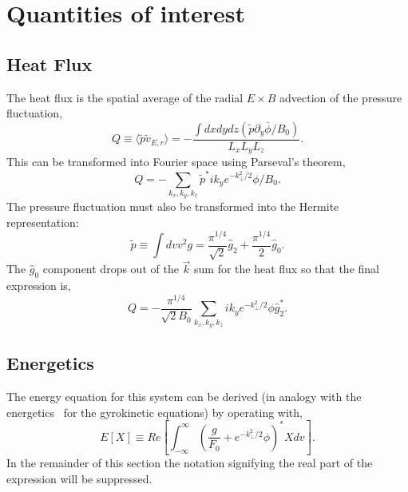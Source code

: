 \section{Quantities of interest}

\subsection{Heat Flux }
The heat flux is the spatial average of the radial $E\times B$ advection of the pressure fluctuation,
\begin{equation}
Q\equiv \langle \tilde{p} \tilde{v}_{E,r} \rangle= -\frac{\int dx dy dz \left ( \tilde{p}\partial_y \bar{\phi}/B_0 \right ) }{ L_x L_y L_z}.
\end{equation}
This can be transformed into Fourier space using Parseval's theorem,
\begin{equation}
Q=-\sum_{k_x,k_y,k_z} \tilde{p}^* i k_y  e^{-k_{\perp}^2/2} \phi/B_0 .
\end{equation}
The pressure fluctuation must also be transformed into the Hermite representation:
\begin{equation}
\tilde{p}\equiv \int dv v^2 g = \frac{\pi^{1/4}}{\sqrt{2}}\hat{g}_2 + \frac{\pi^{1/4}}{2}\hat{g}_0.
\end{equation}
The $\hat{g}_0$ component drops out of the $\vec{k}$ sum for the heat flux so that the final expression is,
\begin{equation}
Q=-\frac{\pi^{1/4}}{\sqrt{2}B_0}\sum_{k_x,k_y,k_z} i k_y  e^{-k_{\perp}^2/2} \phi \hat{g}^*_2.
\end{equation}

\subsection{Energetics }

The energy equation for this system can be derived (in analogy with the energetics~\cite{alejandro} for the gyrokinetic equations) by operating with, 
\begin{equation}
E[X]\equiv Re \left [ \int^\infty_{-\infty} \left ( \frac{g}{F_0} + e^{-k^2_\perp/2}\phi \right )^* X dv \right ].
\end{equation}
In the remainder of this section the notation signifying the real part of the expression will be suppressed.


